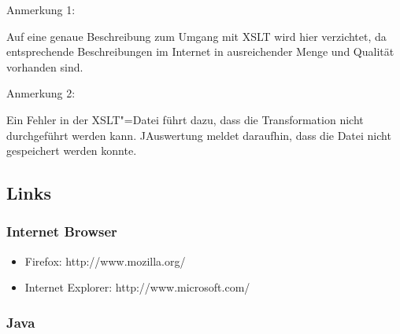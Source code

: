 \documentclass[11pt,a4paper,twoside,ngerman]{article}
\begin{document}
\begin{bfseries}Anmerkung 1:\end{bfseries} Auf eine genaue Beschreibung zum Umgang mit XSLT wird hier verzichtet, da entsprechende Beschreibungen im Internet in ausreichender Menge und Qualität vorhanden sind.

\begin{bfseries}Anmerkung 2:\end{bfseries} Ein Fehler in der XSLT"=Datei führt dazu, dass die Transformation nicht durchgeführt werden kann. JAuswertung meldet daraufhin, dass die Datei nicht gespeichert werden konnte.


\newpage

\subsection{Links}

\subsubsection*{Internet Browser}

\begin{itemize}

\item Firefox: http://www.mozilla.org/


\item Internet Explorer: http://www.microsoft.com/


\end{itemize}

\subsubsection*{Java}
\end{document}
